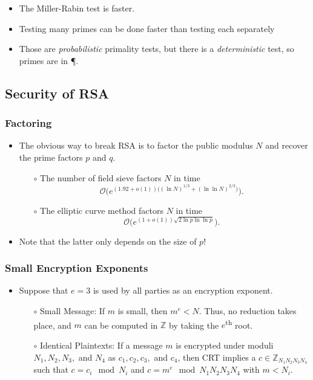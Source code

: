 \documentclass[a4paper]{scrartcl}
\newcommand{\ts}{\textsuperscript}
\begin{document}
\begin{itemize}
\item The Miller-Rabin test is faster.
\item Testing many primes can be done faster than testing each separately
\item Those are \textit{probabilistic} primality tests, but there is a \textit{deterministic} test, so primes are in \P.
\end{itemize}

\subsection*{Security of RSA}

\subsubsection*{Factoring}

\begin{itemize}
\item The obvious way to break RSA is to factor the public modulus $N$ and recover the prime factors $p$ and $q$.
\begin{itemize}
\item [$\circ$] The number of field sieve factors $N$ in time 
$$\mathcal{O}\bigg(e^{(1.92+o(1)) \big((\ln N)^{1/3}+ (\ln \ln N)^{2/3}\big)} \bigg) .$$
\item [$\circ$] The elliptic curve method factors $N$ in time
$$\mathcal{O}\bigg(e^{(1+o(1))\sqrt{2\ln p \ln\ln p}}\bigg) .$$
\end{itemize}
\item Note that the latter only depends on the size of $p$!
\end{itemize}

\subsubsection*{Small Encryption Exponents}

\begin{itemize}
\item Suppose that $e=3$ is used by all parties as an encryption exponent.
\begin{itemize}
\item [$\circ$] Small Message: If $m$ is small, then $m^e < N$. Thus, no reduction takes place, and $m$ can be computed in $\mathbb{Z}$ by taking the $e$\ts{th} root.
\item [$\circ$] Identical Plaintexts: If a message $m$ is encrypted under moduli $N_1, N_2, N_3,$ and $N_4$ as $c_1, c_2, c_3,$ and $c_4$, then CRT implies a $c \in \mathbb{Z}_{N_1N_2N_3N_4}$ such that $c=c_i \mod N_i$ and $c = m^e \mod N_1N_2N_3N_4$ with $m < N_i$.
\end{itemize}
\end{itemize}
\end{document}
